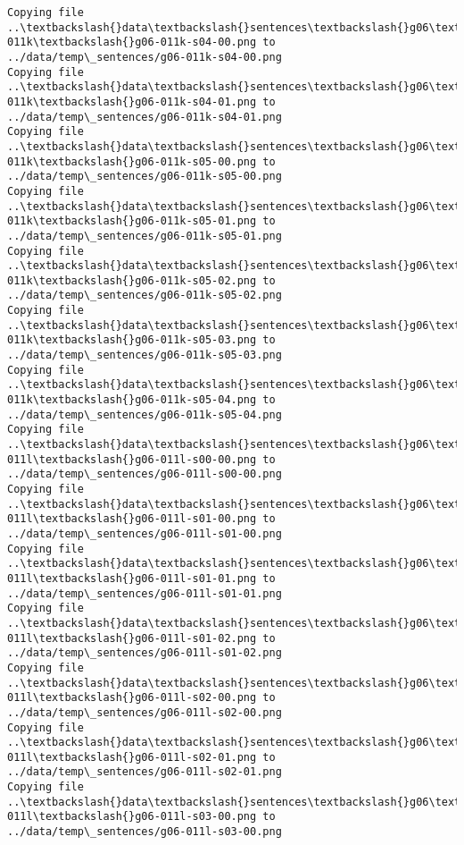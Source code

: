 \documentclass[11pt]{article}
\begin{document}
\begin{Verbatim}[commandchars=\\\{\}]
Copying file ..\textbackslash{}data\textbackslash{}sentences\textbackslash{}g06\textbackslash{}g06-011k\textbackslash{}g06-011k-s04-00.png to
../data/temp\_sentences/g06-011k-s04-00.png
Copying file ..\textbackslash{}data\textbackslash{}sentences\textbackslash{}g06\textbackslash{}g06-011k\textbackslash{}g06-011k-s04-01.png to
../data/temp\_sentences/g06-011k-s04-01.png
Copying file ..\textbackslash{}data\textbackslash{}sentences\textbackslash{}g06\textbackslash{}g06-011k\textbackslash{}g06-011k-s05-00.png to
../data/temp\_sentences/g06-011k-s05-00.png
Copying file ..\textbackslash{}data\textbackslash{}sentences\textbackslash{}g06\textbackslash{}g06-011k\textbackslash{}g06-011k-s05-01.png to
../data/temp\_sentences/g06-011k-s05-01.png
Copying file ..\textbackslash{}data\textbackslash{}sentences\textbackslash{}g06\textbackslash{}g06-011k\textbackslash{}g06-011k-s05-02.png to
../data/temp\_sentences/g06-011k-s05-02.png
Copying file ..\textbackslash{}data\textbackslash{}sentences\textbackslash{}g06\textbackslash{}g06-011k\textbackslash{}g06-011k-s05-03.png to
../data/temp\_sentences/g06-011k-s05-03.png
Copying file ..\textbackslash{}data\textbackslash{}sentences\textbackslash{}g06\textbackslash{}g06-011k\textbackslash{}g06-011k-s05-04.png to
../data/temp\_sentences/g06-011k-s05-04.png
Copying file ..\textbackslash{}data\textbackslash{}sentences\textbackslash{}g06\textbackslash{}g06-011l\textbackslash{}g06-011l-s00-00.png to
../data/temp\_sentences/g06-011l-s00-00.png
Copying file ..\textbackslash{}data\textbackslash{}sentences\textbackslash{}g06\textbackslash{}g06-011l\textbackslash{}g06-011l-s01-00.png to
../data/temp\_sentences/g06-011l-s01-00.png
Copying file ..\textbackslash{}data\textbackslash{}sentences\textbackslash{}g06\textbackslash{}g06-011l\textbackslash{}g06-011l-s01-01.png to
../data/temp\_sentences/g06-011l-s01-01.png
Copying file ..\textbackslash{}data\textbackslash{}sentences\textbackslash{}g06\textbackslash{}g06-011l\textbackslash{}g06-011l-s01-02.png to
../data/temp\_sentences/g06-011l-s01-02.png
Copying file ..\textbackslash{}data\textbackslash{}sentences\textbackslash{}g06\textbackslash{}g06-011l\textbackslash{}g06-011l-s02-00.png to
../data/temp\_sentences/g06-011l-s02-00.png
Copying file ..\textbackslash{}data\textbackslash{}sentences\textbackslash{}g06\textbackslash{}g06-011l\textbackslash{}g06-011l-s02-01.png to
../data/temp\_sentences/g06-011l-s02-01.png
Copying file ..\textbackslash{}data\textbackslash{}sentences\textbackslash{}g06\textbackslash{}g06-011l\textbackslash{}g06-011l-s03-00.png to
../data/temp\_sentences/g06-011l-s03-00.png

\end{Verbatim}
\end{document}
